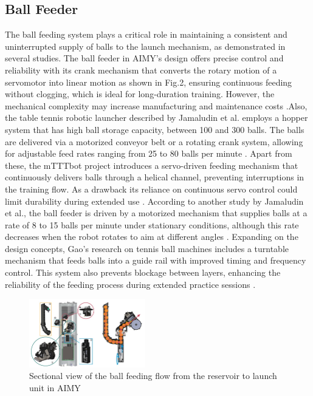 \documentclass[12pt]{article}
\begin{document}
\subsection{Ball Feeder}

The ball feeding system plays a critical role in maintaining a consistent and uninterrupted supply of balls to the launch mechanism, as demonstrated in several studies. The ball feeder in AIMY’s design offers precise control and reliability with its crank mechanism that converts the rotary motion of a servomotor into linear motion as shown in Fig.2, ensuring continuous feeding without clogging, which is ideal for long-duration training. However, the mechanical complexity may increase manufacturing and maintenance costs \cite{Dittrich2023}.Also, the table tennis robotic launcher described by Jamaludin et al. employs a hopper system that has high ball storage capacity, between 100 and 300 balls. The balls are delivered via a motorized conveyor belt or a rotating crank system, allowing for adjustable feed rates ranging from 25 to 80 balls per minute \cite{Jamaludin2022}. Apart from these, the mTTTbot project introduces a servo-driven feeding mechanism that continuously delivers balls through a helical channel, preventing interruptions in the training flow. As a drawback its reliance on continuous servo control could limit durability during extended use \cite{Tasci2023}. According to another study by Jamaludin et al., the ball feeder is driven by a motorized mechanism that supplies balls at a rate of 8 to 15 balls per minute under stationary conditions, although this rate decreases when the robot rotates to aim at different angles \cite{Jamaludin2023}. Expanding on the design concepts, Gao’s research on tennis ball machines includes a turntable mechanism that feeds balls into a guide rail with improved timing and frequency control. This system also prevents blockage between layers, enhancing the reliability of the feeding process during extended practice sessions \cite{Gao2019}. 

\vspace{0.5cm}\begin{figure}[H]
\centering
\includegraphics[width=0.45\textwidth,height=0.26\textwidth]{figures/fig2.jpg}
\caption{Sectional view of the ball feeding flow from the reservoir to launch unit in AIMY \cite{Dittrich2023}}
\end{figure}
\end{document}
